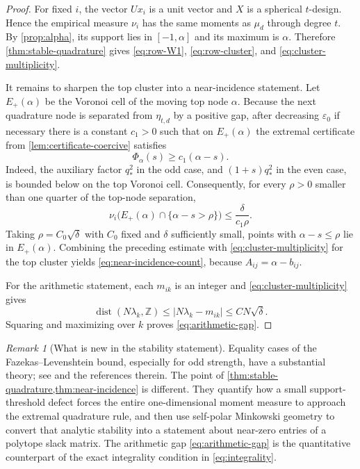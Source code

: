 \documentclass[11pt]{amsart}
\theoremstyle{definition}
\theoremstyle{remark}
\newtheorem{remark}[theorem]{Remark}
\begin{document}
\begin{proof}
For fixed $i$, the vector $Ux_i$ is a unit vector and $X$ is a spherical $t$-design.  Hence the empirical measure $\nu_i$ has the same moments as $\mu_d$ through degree $t$.  By \cref{prop:alpha}, its support lies in $[-1,\alpha]$ and its maximum is $\alpha$.  Therefore \cref{thm:stable-quadrature} gives \eqref{eq:row-W1}, \eqref{eq:row-cluster}, and \eqref{eq:cluster-multiplicity}.

It remains to sharpen the top cluster into a near-incidence statement.  Let $E_+(\alpha)$ be the Voronoi cell of the moving top node $\alpha$.  Because the next quadrature node is separated from $\eta_{t,d}$ by a positive gap, after decreasing $\varepsilon_0$ if necessary there is a constant $c_1>0$ such that on $E_+(\alpha)$ the extremal certificate from \cref{lem:certificate-coercive} satisfies
\begin{equation}\label{eq:linear-top-coercivity}
 \Phi_\alpha(s)\ge c_1(\alpha-s).
\end{equation}
Indeed, the auxiliary factor $q_*^2$ in the odd case, and $(1+s)q_*^2$ in the even case, is bounded below on the top Voronoi cell.  Consequently, for every $\rho>0$ smaller than one quarter of the top-node separation,
\[
 \nu_i\bigl(E_+(\alpha)\cap\{\alpha-s>\rho\}\bigr)
 \le \frac{\delta}{c_1\rho}.
\]
Taking $\rho=C_0\sqrt\delta$ with $C_0$ fixed and $\delta$ sufficiently small, points with $\alpha-s\le\rho$ lie in $E_+(\alpha)$.  Combining the preceding estimate with \eqref{eq:cluster-multiplicity} for the top cluster yields \eqref{eq:near-incidence-count}, because $A_{ij}=\alpha-b_{ij}$.

For the arithmetic statement, each $m_{ik}$ is an integer and \eqref{eq:cluster-multiplicity} gives
\[
 \operatorname{dist}(N\lambda_k,\mathbb Z)
 \le |N\lambda_k-m_{ik}|
 \le CN\sqrt\delta.
\]
Squaring and maximizing over $k$ proves \eqref{eq:arithmetic-gap}.  \qedhere
\end{proof}

\begin{remark}[What is new in the stability statement]\label{rem:stability-novelty}
Equality cases of the Fazekas--Levenshtein bound, especially for odd strength, have a substantial theory; see \cite{Borodachov2024} and the references therein.  The point of \cref{thm:stable-quadrature,thm:near-incidence} is different.  They quantify how a small support-threshold defect forces the entire one-dimensional moment measure to approach the extremal quadrature rule, and then use self-polar Minkowski geometry to convert that analytic stability into a statement about near-zero entries of a polytope slack matrix.  The arithmetic gap \eqref{eq:arithmetic-gap} is the quantitative counterpart of the exact integrality condition in \eqref{eq:integrality}.
\end{remark}
\end{document}
